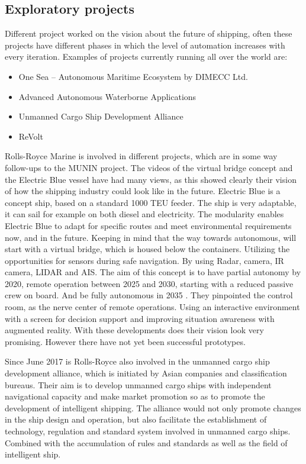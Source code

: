 \subsection{Exploratory projects}
Different project worked on the vision about the future of shipping, often these projects have different phases in which the level of automation increases with every iteration. Examples of projects currently running all over the world are:
\begin{itemize}
	\item One Sea – Autonomous Maritime Ecosystem by DIMECC Ltd.
	\item Advanced Autonomous Waterborne Applications
	\item Unmanned Cargo Ship Development Alliance 
	\item ReVolt
\end{itemize}

Rolls-Royce Marine is involved in different projects, which are in some way follow-ups to the MUNIN project. The videos of the virtual bridge concept and the Electric Blue vessel have had many views, as this showed clearly their vision of how the shipping industry could look like in the future. Electric Blue is a concept ship, based on a standard 1000 TEU feeder. The ship is very adaptable, it can sail for example on both diesel and electricity. The modularity enables Electric Blue to adapt for specific routes and meet environmental requirements now, and in the future. 
Keeping in mind that the way towards autonomous, will start with a virtual bridge, which is housed below the containers. Utilizing the opportunities for sensors during safe navigation. By using Radar, camera, IR camera, LIDAR and \ac{AIS}. The aim of this concept is to have partial autonomy by 2020, remote operation between 2025 and 2030, starting with a reduced passive crew on board. And be fully autonomous in 2035 \cite{Wilson2017}. 
They pinpointed the control room, as the nerve center of remote operations. Using an interactive environment with a screen for decision support and improving situation awareness with augmented reality. With these developments does their vision look very promising. However there have not yet been successful prototypes.

Since June 2017 is Rolls-Royce also involved in the unmanned cargo ship development alliance, which is initiated by Asian companies and classification bureaus. Their aim is to develop unmanned cargo ships with independent navigational capacity and make market promotion so as to promote the development of intelligent shipping.
The alliance would not only promote changes in the ship design and operation, but also facilitate the establishment of technology, regulation and standard system involved in unmanned cargo ships. Combined with the accumulation of rules and standards as well as the field of intelligent ship.

